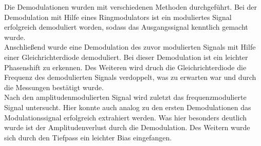 Die Demodulationen wurden mit verschiedenen Methoden durchgeführt. Bei der
Demodulation mit Hilfe eines Ringmodulators ist ein moduliertes Signal
erfolgreich demoduliert worden, sodass das Ausgangssignal kenntlich gemacht wurde. \\
Anschließend wurde eine Demodulation des zuvor modulierten Signals mit Hilfe
einer Gleichrichterdiode demoduliert. Bei dieser Demodulation ist ein
leichter Phasenshift zu erkennen. Des Weiteren wird druch die Gleichrichterdiode
die Frequenz des demodulierten Signals verdoppelt, was zu erwarten war und durch
die Messungen bestätigt wurde. \\
Nach den amplitudenmodulierten Signal wird zuletzt das frequenzmodulierte Signal untersucht.
Hier konnte auch analog zu den ersten Demodulationen das Modulationssignal
erfolgreich extrahiert werden. Was hier besonders deutlich wurde ist der
Amplitudenverlust durch die Demodulation.  Des Weitern wurde sich durch den
Tiefpass ein leichter Bias eingefangen.
